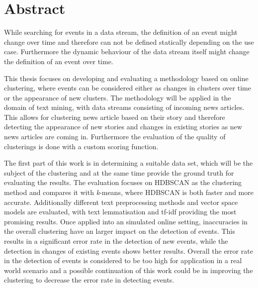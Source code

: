 
\section*{Abstract}


While searching for events in a data stream, the definition of an event might change over time and therefore can not be defined statically depending on the use case. Furthermore the dynamic behaviour of the data stream itself might change the definition of an event over time.

This thesis focuses on developing and evaluating a methodology based on online clustering, where events can be considered either as changes in clusters over time or the appearance of new clusters. The methodology will be applied in the domain of text mining, with data streams consisting of incoming news articles. This allows for clustering news article based on their story and therefore detecting the appearance of new stories and changes in existing stories as new news articles are coming in. Furthermore the evaluation of the quality of clusterings is done with a custom scoring function.

The first part of this work is in determining a suitable data set, which will be the subject of the clustering and at the same time provide the ground truth for evaluating the results. The evaluation focuses on HDBSCAN as the clustering method and compares it with \textit{k}-means, where HDBSCAN is both faster and more accurate. Additionally different text preprocessing methods and vector space models are evaluated, with text lemmatisation and tf-idf providing the most promising results. Once applied into an simulated online setting, inaccuracies in the overall clustering have an larger impact on the detection of events. This results in a significant error rate in the detection of new events, while the detection in changes of existing events shows better results. Overall the error rate in the detection of events is considered to be too high for application in a real world scenario and a possible continuation of this work could be in improving the clustering to decrease the error rate in detecting events.



